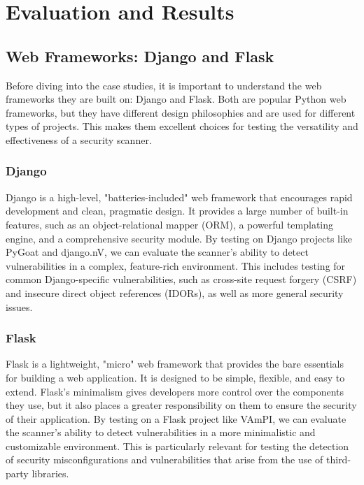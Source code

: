 \chapter{Evaluation and Results}
\label{chap:evaluation}

\section{Web Frameworks: Django and Flask}

Before diving into the case studies, it is important to understand the web frameworks they are built on: Django and Flask. Both are popular Python web frameworks, but they have different design philosophies and are used for different types of projects. This makes them excellent choices for testing the versatility and effectiveness of a security scanner.

\subsection*{Django}
Django is a high-level, "batteries-included" web framework that encourages rapid development and clean, pragmatic design. It provides a large number of built-in features, such as an object-relational mapper (ORM), a powerful templating engine, and a comprehensive security module. By testing on Django projects like PyGoat and django.nV, we can evaluate the scanner's ability to detect vulnerabilities in a complex, feature-rich environment. This includes testing for common Django-specific vulnerabilities, such as cross-site request forgery (CSRF) and insecure direct object references (IDORs), as well as more general security issues.

\subsection*{Flask}
Flask is a lightweight, "micro" web framework that provides the bare essentials for building a web application. It is designed to be simple, flexible, and easy to extend. Flask's minimalism gives developers more control over the components they use, but it also places a greater responsibility on them to ensure the security of their application. By testing on a Flask project like VAmPI, we can evaluate the scanner's ability to detect vulnerabilities in a more minimalistic and customizable environment. This is particularly relevant for testing the detection of security misconfigurations and vulnerabilities that arise from the use of third-party libraries.

